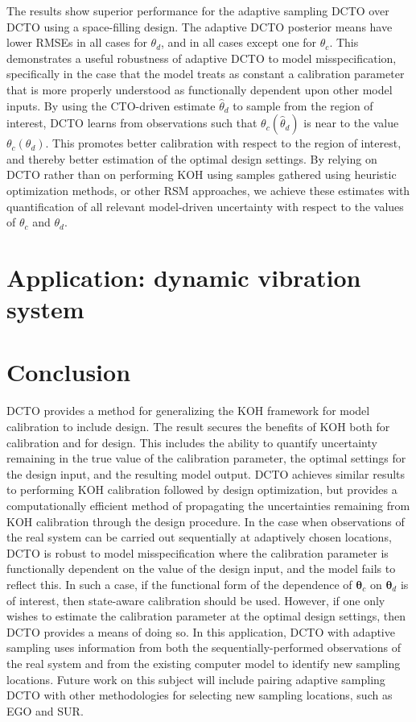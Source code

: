 \documentclass[12pt]{article}
\begin{document}
%
The results show superior performance for the adaptive sampling DCTO over DCTO using a space-filling design.
%
The adaptive DCTO posterior means have lower RMSEs in all cases for $\theta_d$, and in all cases except one for $\theta_c$.
%
This demonstrates a useful robustness of adaptive DCTO to model misspecification, specifically in the case that the model treats as constant a calibration parameter that is more properly understood as functionally dependent upon other model inputs.
%
By using the CTO-driven estimate $\widehat\theta_d$ to sample from the region of interest, DCTO learns from observations such that $\theta_c(\widehat\theta_d)$ is near to the value $\theta_c(\theta_d)$.
%
This promotes better calibration with respect to the region of interest, and thereby better estimation of the optimal design settings.
%
By relying on DCTO rather than on performing KOH using samples gathered using heuristic optimization methods, or other RSM approaches, we achieve these estimates with quantification of all relevant model-driven uncertainty with respect to the values of $\theta_c$ and $\theta_d$.
%

%
\section{Application: dynamic vibration system}
%

%

%
\section{Conclusion}\label{sec:conclusion}
%
DCTO provides a method for generalizing the KOH framework for model calibration to include design.
%
The result secures the benefits of KOH both for calibration and for design.
%
This includes the ability to quantify uncertainty remaining in the true value of the calibration parameter, the optimal settings for the design input, and the resulting model output.
%
DCTO achieves similar results to performing KOH calibration followed by design optimization, but provides a computationally efficient method of propagating the uncertainties remaining from KOH calibration through the design procedure.
%
In the case when observations of the real system can be carried out sequentially at adaptively chosen locations, DCTO is robust to model misspecification where the calibration parameter is functionally dependent on the value of the design input, and the model fails to reflect this.
%
In such a case, if the functional form of  the dependence of $\boldsymbol\theta_c$ on $\boldsymbol\theta_d$ is of interest, then state-aware calibration should be used.
%
However, if one only wishes to estimate the calibration parameter at the optimal design settings, then DCTO provides a means of doing so.
%
In this application, DCTO with adaptive sampling uses information from both the sequentially-performed observations of the real system and from the existing computer model to identify new sampling locations.
%
Future work on this subject will include pairing adaptive sampling DCTO with other methodologies for selecting new sampling locations, such as EGO and SUR.
%
\end{document}

